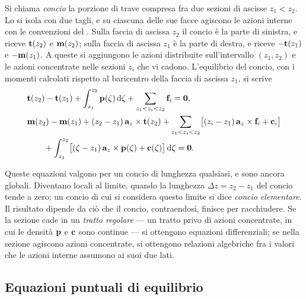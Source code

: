 Si chiama \emph{concio} la porzione
di trave compresa fra due sezioni di ascisse $z_1 < z_2$.
Lo si isola con due tagli, e su ciascuna delle sue facce
agiscono le azioni interne con le convenzioni del
. Sulla faccia di ascissa $z_2$
il concio è la parte di sinistra, e riceve $\mathbf{t}(z_2)$ e
$\mathbf{m}(z_2)$; sulla faccia di ascissa $z_1$ è la parte di
destra, e riceve $-\mathbf{t}(z_1)$ e $-\mathbf{m}(z_1)$. A queste si
aggiungono le azioni distribuite sull'intervallo
$(z_1, z_2)$ e le azioni concentrate nelle sezioni $z_i$
che vi cadono. L'equilibrio del concio, con i momenti
calcolati rispetto al baricentro della faccia di ascissa
$z_1$, si scrive
\begin{equation}\label{eq:eq_concio}
	\begin{aligned}
		&\mathbf{t}(z_2) - \mathbf{t}(z_1) + \int_{z_1}^{z_2} \mathbf{p}(\zeta)\,\mathrm{d}\zeta
		+ \sum_{z_1 < z_i < z_2} \mathbf{f}_i = \mathbf{0},\\
		&\mathbf{m}(z_2) - \mathbf{m}(z_1) + (z_2 - z_1)\,\mathbf{a}_z \times \mathbf{t}(z_2)
		+ \sum_{z_1 < z_i < z_2} \bigl[(z_i - z_1)\,\mathbf{a}_z \times \mathbf{f}_i + \mathbf{c}_i\bigr]\\
		&\qquad + \int_{z_1}^{z_2} \bigl[(\zeta - z_1)\,\mathbf{a}_z \times \mathbf{p}(\zeta) + \mathbf{c}(\zeta)\bigr]\,\mathrm{d}\zeta
		= \mathbf{0}.
	\end{aligned}
\end{equation}

Queste equazioni valgono per un concio di lunghezza
qualsiasi, e sono ancora globali. Diventano locali al
limite, quando la lunghezza $\Delta z = z_2 - z_1$ del
concio tende a zero; un concio di cui si considera questo
limite si dice \emph{concio elementare}.
Il risultato dipende da ciò che il concio, contraendosi,
finisce per racchiudere. Se la sezione cade in un
\emph{tratto regolare} ---
un tratto privo di azioni concentrate, in cui le densità
$\mathbf{p}$ e $\mathbf{c}$ sono continue --- si ottengono equazioni
differenziali; se nella sezione agiscono azioni
concentrate, si ottengono relazioni algebriche fra i
valori che le azioni interne assumono ai suoi due lati.



\subsection{Equazioni puntuali di equilibrio}
\label{sec:eq_indefinite}

